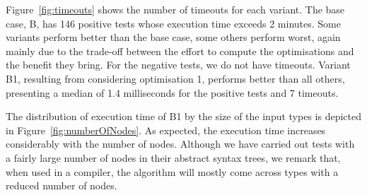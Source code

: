 Figure~\ref{fig:timeouts} shows the number of timeouts for each
variant.  The base case, B, has 146 positive tests whose execution
time exceeds 2 minutes. Some variants perform better than the base
case, some others perform worst, again mainly due to the trade-off
between the effort to compute the optimisations and the benefit they
bring.  For the negative tests, we do not have timeouts.  Variant B1,
resulting from considering optimisation 1, performs better than all
others, presenting a median of 1.4 milliseconds for the positive tests
and 7 timeouts.

The distribution of execution time of B1 by the size of the input
types is depicted in Figure~\ref{fig:numberOfNodes}.
As expected, the execution time increases considerably with the number of nodes.
%
Although we have carried out tests with a
fairly large number of nodes in their abstract syntax trees, we remark
that, when used in a compiler, the algorithm will mostly come across
types with a reduced number of nodes.



